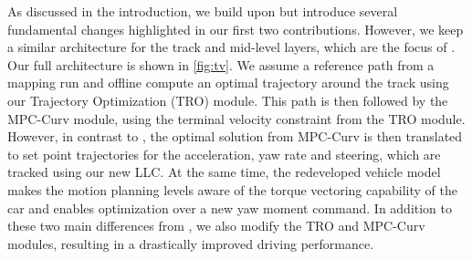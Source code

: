 As discussed in the introduction, we build upon \cite{vazquez2020optimization} but introduce several fundamental changes highlighted in our first two contributions. However, we keep a similar architecture for the track and mid-level layers, which are the focus of \cite{vazquez2020optimization}. Our full architecture is shown in \cref{fig:tv}. We assume a reference path from a mapping run and offline compute an optimal trajectory around the track using our Trajectory Optimization (TRO) module. This path is then followed by the MPC-Curv module, using the terminal velocity constraint from the TRO module. However, in contrast to \cite{vazquez2020optimization}, the optimal solution from MPC-Curv is then translated to set point trajectories for the acceleration, yaw rate and steering, which are tracked using our new LLC. 
At the same time, the redeveloped vehicle model makes the motion planning levels aware of the torque vectoring capability of the car and enables optimization over a new yaw moment command. In addition to these two main differences from \cite{vazquez2020optimization}, we also modify the TRO and MPC-Curv modules, resulting in a drastically improved driving performance.
